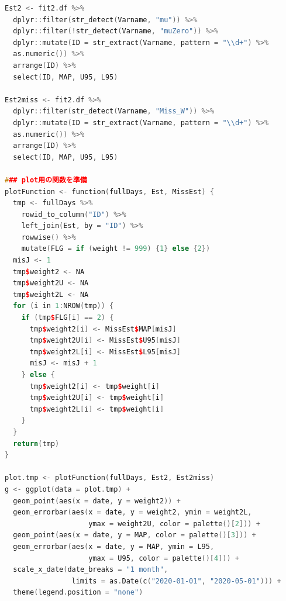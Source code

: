 \begin{lstlisting}[language=c++,label={code:29_04b},caption={プロット用にデータを整形する関数とプロットのコード}]
Est2 <- fit2.df %>%
  dplyr::filter(str_detect(Varname, "mu")) %>%
  dplyr::filter(!str_detect(Varname, "muZero")) %>%
  dplyr::mutate(ID = str_extract(Varname, pattern = "\\d+") %>% 
  as.numeric()) %>%
  arrange(ID) %>%
  select(ID, MAP, U95, L95)

Est2miss <- fit2.df %>%
  dplyr::filter(str_detect(Varname, "Miss_W")) %>%
  dplyr::mutate(ID = str_extract(Varname, pattern = "\\d+") %>% 
  as.numeric()) %>%
  arrange(ID) %>%
  select(ID, MAP, U95, L95)

### plot用の関数を準備
plotFunction <- function(fullDays, Est, MissEst) {
  tmp <- fullDays %>%
    rowid_to_column("ID") %>%
    left_join(Est, by = "ID") %>%
    rowwise() %>%
    mutate(FLG = if (weight != 999) {1} else {2})
  misJ <- 1
  tmp$weight2 <- NA
  tmp$weight2U <- NA
  tmp$weight2L <- NA
  for (i in 1:NROW(tmp)) {
    if (tmp$FLG[i] == 2) {
      tmp$weight2[i] <- MissEst$MAP[misJ]
      tmp$weight2U[i] <- MissEst$U95[misJ]
      tmp$weight2L[i] <- MissEst$L95[misJ]
      misJ <- misJ + 1
    } else {
      tmp$weight2[i] <- tmp$weight[i]
      tmp$weight2U[i] <- tmp$weight[i]
      tmp$weight2L[i] <- tmp$weight[i]
    }
  }
  return(tmp)
}

plot.tmp <- plotFunction(fullDays, Est2, Est2miss)
g <- ggplot(data = plot.tmp) +
  geom_point(aes(x = date, y = weight2)) +
  geom_errorbar(aes(x = date, y = weight2, ymin = weight2L, 
                    ymax = weight2U, color = palette()[2])) +
  geom_point(aes(x = date, y = MAP, color = palette()[3])) +
  geom_errorbar(aes(x = date, y = MAP, ymin = L95, 
                    ymax = U95, color = palette()[4])) +
  scale_x_date(date_breaks = "1 month", 
                limits = as.Date(c("2020-01-01", "2020-05-01"))) +
  theme(legend.position = "none")
\end{lstlisting}
